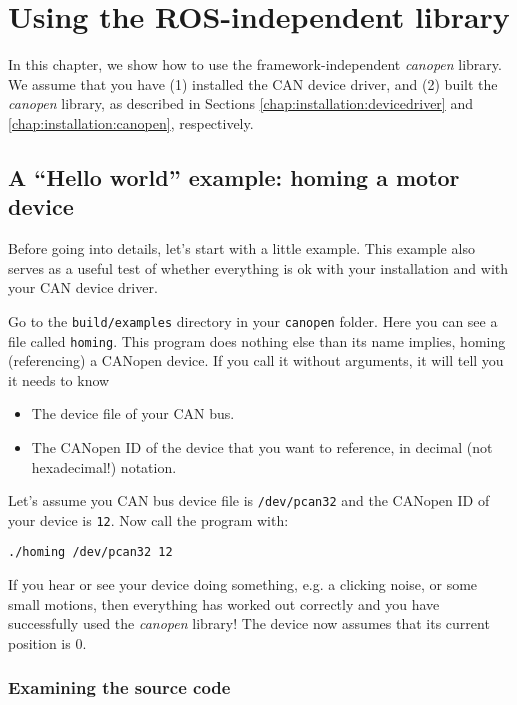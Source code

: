 \chapter{Using the ROS-independent library}
\label{chap:rosindependentlibrary}

In this chapter, we show how to use the framework-independent {\em canopen} library. We assume that you have (1) installed the CAN device driver, and (2) built the {\em canopen} library, as described in Sections \ref{chap:installation:devicedriver} and \ref{chap:installation:canopen}, respectively.

\section{A ``Hello world'' example: homing a motor device}

Before going into details, let's start with a little example. This example also serves as a useful test of whether everything is ok with your installation and with your CAN device driver.

Go to the \texttt{build/examples} directory in your \texttt{canopen} folder. Here you can see a file called \texttt{homing}. This program does nothing else than its name implies, homing (referencing) a CANopen device.
If you call it without arguments, it will tell you it needs to know
\begin{itemize}
\item The device file of your CAN bus.
\item The CANopen ID of the device that you want to reference, in decimal (not hexadecimal!) notation.
\end{itemize}

Let's assume you CAN bus device file is \texttt{/dev/pcan32} and the CANopen ID of your device is \texttt{12}. Now call the program with:
\begin{verbatim}
./homing /dev/pcan32 12
\end{verbatim}

If you hear or see your device doing something, e.g. a clicking noise, or some small motions, then everything has worked out correctly and you have successfully used the {\em canopen} library! The device now assumes that its current position is $0$.

\subsection{Examining the source code}

